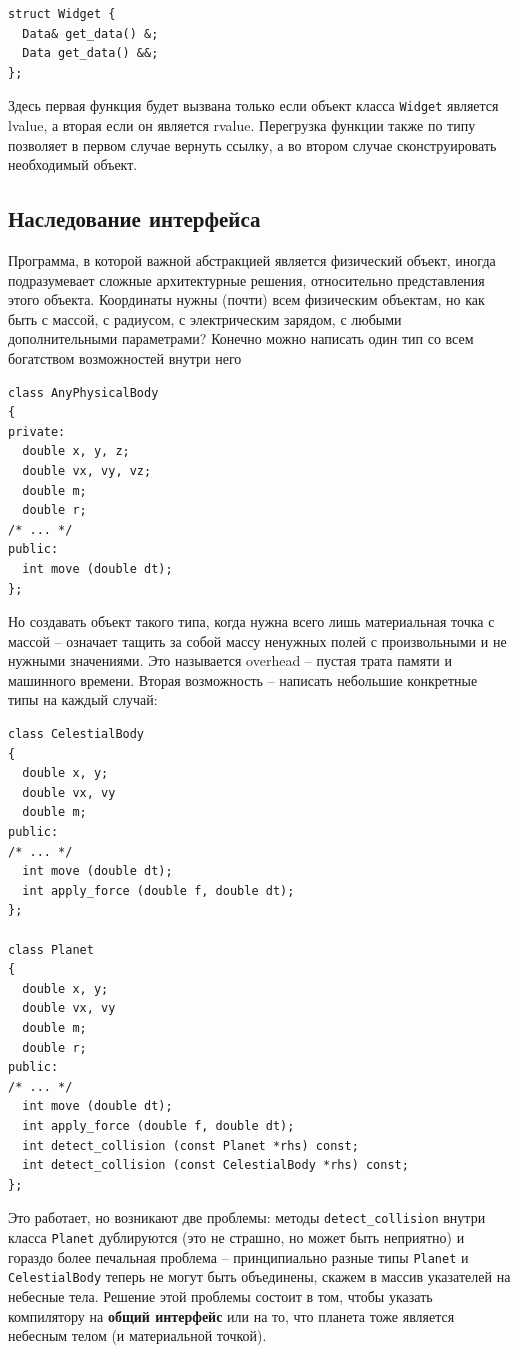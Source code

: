 \documentclass[a4paper,12pt,oneside]{article}
\begin{document}
\begin{lstlisting}
struct Widget {
  Data& get_data() &;
  Data get_data() &&;
};
\end{lstlisting}

Здесь первая функция будет вызвана только если объект класса \lstinline!Widget! является lvalue, а вторая если он является rvalue. Перегрузка функции также по типу позволяет в первом случае вернуть ссылку, а во втором случае сконструировать необходимый объект.

\pagebreak
\subsection{Наследование интерфейса}\label{IntfInheritance}

Программа, в которой важной абстракцией является физический объект, иногда подразумевает сложные архитектурные решения, относительно представления этого объекта. Координаты нужны (почти) всем физическим объектам, но как быть с массой, с радиусом, с электрическим зарядом, с любыми дополнительными параметрами? Конечно можно написать один тип со всем богатством возможностей внутри него

\begin{lstlisting}
class AnyPhysicalBody
{
private:
  double x, y, z;
  double vx, vy, vz;
  double m;
  double r;
/* ... */
public:
  int move (double dt);
};
\end{lstlisting}

Но создавать объект такого типа, когда нужна всего лишь материальная точка с массой -- означает тащить за собой массу ненужных полей с произвольными и не нужными значениями. Это называется overhead -- пустая трата памяти и машинного времени. Вторая возможность -- написать небольшие конкретные типы на каждый случай:

\begin{lstlisting}
class CelestialBody
{
  double x, y;
  double vx, vy
  double m;
public:
/* ... */
  int move (double dt);
  int apply_force (double f, double dt);
};

class Planet
{
  double x, y;
  double vx, vy
  double m;
  double r;
public:
/* ... */
  int move (double dt);
  int apply_force (double f, double dt);
  int detect_collision (const Planet *rhs) const;
  int detect_collision (const CelestialBody *rhs) const;
};
\end{lstlisting}

Это работает, но возникают две проблемы: методы \lstinline!detect_collision! внутри класса \lstinline!Planet! дублируются (это не страшно, но может быть неприятно) и гораздо более печальная проблема -- принципиально разные типы \lstinline!Planet! и \lstinline!CelestialBody! теперь не могут быть объединены, скажем в массив указателей на небесные тела. Решение этой проблемы состоит в том, чтобы указать компилятору на \textbf{общий интерфейс} или на то, что планета тоже является небесным телом (и материальной точкой).
\end{document}
